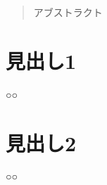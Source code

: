 \documentclass[uplatex]{jsarticle}
\date{YYYY/MM/DD}		%
\author{○○ ○○}		%
\begin{document}


\begin{abstract}
アブストラクト
\end{abstract}



\section{見出し1}

○○


\section{見出し2}

○○


\end{document}
